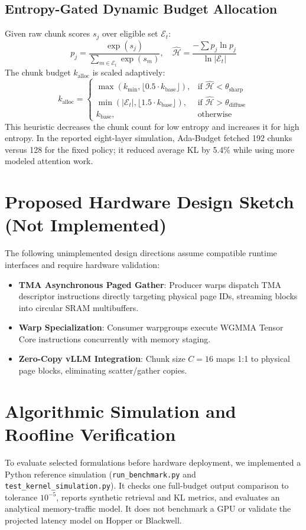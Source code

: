 \documentclass[10pt,twocolumn]{article}
\begin{document}
\subsection{Entropy-Gated Dynamic Budget Allocation}
Given raw chunk scores $s_j$ over eligible set $\mathcal{E}_t$:
\begin{equation}
p_j = \frac{\exp(s_j)}{\sum_{m \in \mathcal{E}_t} \exp(s_m)}, \quad \hat{\mathcal{H}} = \frac{-\sum p_j \ln p_j}{\ln |\mathcal{E}_t|}
\end{equation}
The chunk budget $k_{\text{alloc}}$ is scaled adaptively:
\begin{equation}
k_{\text{alloc}} = \begin{cases}
\max\left(k_{\min}, \lfloor 0.5 \cdot k_{\text{base}} \rfloor\right), & \text{if } \hat{\mathcal{H}} < \theta_{\text{sharp}} \\
\min\left(|\mathcal{E}_t|, \lfloor 1.5 \cdot k_{\text{base}} \rfloor\right), & \text{if } \hat{\mathcal{H}} > \theta_{\text{diffuse}} \\
k_{\text{base}}, & \text{otherwise}
\end{cases}
\end{equation}
This heuristic decreases the chunk count for low entropy and increases it for high entropy. In the reported eight-layer simulation, Ada-Budget fetched 192 chunks versus 128 for the fixed policy; it reduced average KL by 5.4\% while using more modeled attention work.

\section{Proposed Hardware Design Sketch (Not Implemented)}
The following unimplemented design directions assume compatible runtime interfaces and require hardware validation:
\begin{itemize}
    \item \textbf{TMA Asynchronous Paged Gather}: Producer warps dispatch TMA descriptor instructions directly targeting physical page IDs, streaming blocks into circular SRAM multibuffers.
    \item \textbf{Warp Specialization}: Consumer warpgroups execute WGMMA Tensor Core instructions concurrently with memory staging.
    \item \textbf{Zero-Copy vLLM Integration}: Chunk size $C=16$ maps 1:1 to physical page blocks, eliminating scatter/gather copies.
\end{itemize}

\section{Algorithmic Simulation and Roofline Verification}
To evaluate selected formulations before hardware deployment, we implemented a Python reference simulation (\texttt{run\_benchmark.py} and \texttt{test\_kernel\_simulation.py}). It checks one full-budget output comparison to tolerance $10^{-5}$, reports synthetic retrieval and KL metrics, and evaluates an analytical memory-traffic model. It does not benchmark a GPU or validate the projected latency model on Hopper or Blackwell.
\end{document}
